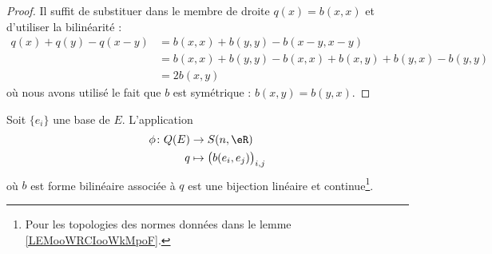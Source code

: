 \begin{proof}
	Il suffit de substituer dans le membre de droite \( q(x)=b(x,x)\) et d'utiliser la bilinéarité :
	\begin{subequations}
		\begin{align}
			q(x)+q(y)-q(x-y) & =b(x,x)+b(y,y)-b(x-y,x-y)                  \\
			                 & =b(x,x)+b(y,y)-b(x,x)+b(x,y)+b(y,x)-b(y,y) \\
			                 & =2b(x,y)
		\end{align}
	\end{subequations}
	où nous avons utilisé le fait que \( b\) est symétrique : \( b(x,y)=b(y,x)\).
\end{proof}

\begin{proposition} \label{PropFSXooRUMzdb}
	Soit \( \{ e_i \}\) une base de \( E\). L'application
	\begin{equation}
		\begin{aligned}
			\phi\colon Q(E) & \to S(n,\eR)                             \\
			q               & \mapsto \big(   b(e_i,e_j)   \big)_{i,j}
		\end{aligned}
	\end{equation}
	où \( b\) est forme bilinéaire associée à \( q\) est une bijection linéaire et continue\footnote{Pour les topologies des normes données dans le lemme \ref{LEMooWRCIooWkMpoF}.}.
\end{proposition}

